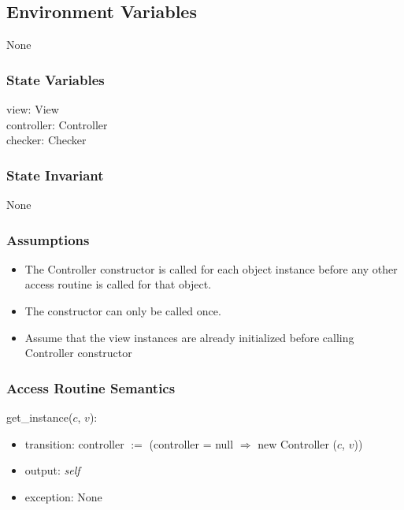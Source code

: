 \documentclass[12pt]{article}
\begin{document}
\subsection*{Environment Variables}

None

\subsubsection* {State Variables}

view: View \\
controller: Controller\\
checker: Checker

\subsubsection* {State Invariant}

None

\subsubsection* {Assumptions}

\begin{itemize}
  \item The Controller constructor is called for each object instance before any
  other access routine is called for that object.  
  \item The constructor can only be called once.
  \item Assume that the view instances are already initialized before calling 
  Controller constructor
\end{itemize}

\subsubsection* {Access Routine Semantics}

get\_instance($c$, $v$):
\begin{itemize}
  \item transition: controller $:=$ (controller = null $\Rightarrow$ new Controller ($c$, $v$))
  \item output: \textit{self}
  \item exception: None
\end{itemize}

\end{document}
